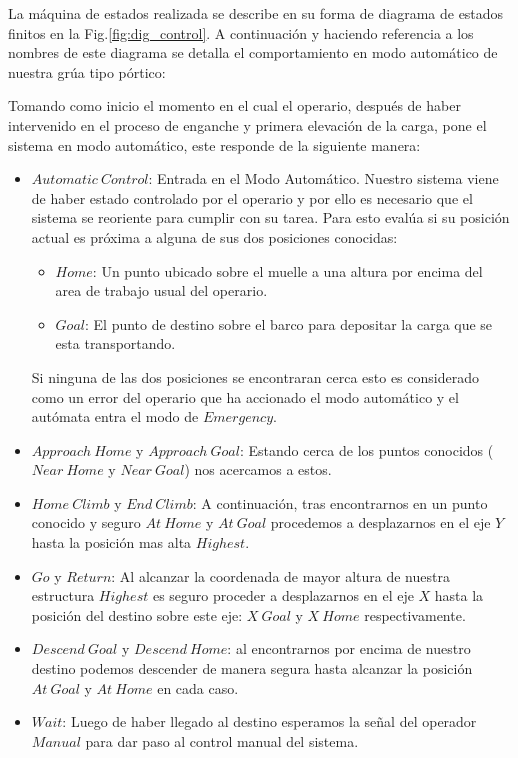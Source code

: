 \documentclass[journal]{IEEEtran}
\begin{document}
La máquina de estados realizada se describe en su forma de
diagrama de estados finitos en la Fig.\ref{fig:dig_control}. A continuación y haciendo 
referencia a los nombres de este diagrama se detalla el comportamiento en modo automático 
de nuestra grúa tipo pórtico:

Tomando como inicio el momento en el cual el operario, después de haber intervenido en 
el proceso de enganche y primera elevación de la carga, pone el sistema en modo 
automático, este responde de la siguiente manera:
\begin{itemize}
 \item $Automatic~Control$: Entrada en el Modo Automático. Nuestro sistema viene de
 haber estado controlado por el operario y por ello es necesario que el sistema se 
 reoriente para cumplir con su tarea. Para esto evalúa si su posición actual es 
 próxima a alguna de sus dos posiciones conocidas:
 \begin{itemize}
  \item $Home$: Un punto ubicado sobre el muelle a una altura por encima del 
  area de trabajo usual del operario.
  \item $Goal$: El punto de destino sobre el barco para depositar la carga que se esta
  transportando.
 \end{itemize}
 Si ninguna de las dos posiciones se encontraran cerca esto es considerado como un error 
 del operario que ha accionado el modo automático y el autómata entra el modo
 de $Emergency$.
 \item $Approach~Home$ y $Approach~Goal$: Estando cerca de los puntos conocidos  
 ($Near~Home$ y $Near~Goal$) nos acercamos a estos.
 \item $Home~Climb$ y $End~Climb$: A continuación, tras encontrarnos en un punto conocido 
 y seguro $At~Home$ y $At~Goal$ procedemos a desplazarnos
 en el eje $Y$ hasta la posición mas alta $Highest$.
 \item $Go$ y $Return$: Al alcanzar la coordenada de mayor altura de nuestra 
  estructura $Highest$ es seguro proceder a desplazarnos en el eje $X$ hasta la posición 
  del destino sobre este eje: $ X~Goal$ y $X~Home$ respectivamente.
 \item $Descend~Goal$ y $Descend~Home$: al encontrarnos por encima de nuestro destino 
 podemos descender de manera segura hasta alcanzar la posición $At~Goal$ y $At~Home$
 en cada caso.
 \item $Wait$: Luego de haber llegado al destino esperamos la señal del 
 operador $Manual$ para dar paso al control manual del sistema.
\end{itemize}
\end{document}
